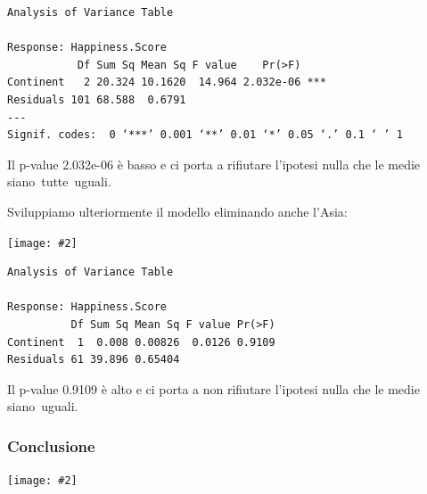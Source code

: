 \documentclass{beamer}
\newcommand{\fg}[2]{%
  \begin{center}
      \texttt{[image: \#2]}%
  \end{center}
}
\begin{document}
\begin{frame}[fragile]
    \tiny
    \begin{verbatim}
Analysis of Variance Table

Response: Happiness.Score
           Df Sum Sq Mean Sq F value    Pr(>F)    
Continent   2 20.324 10.1620  14.964 2.032e-06 ***
Residuals 101 68.588  0.6791                      
---
Signif. codes:  0 ‘***’ 0.001 ‘**’ 0.01 ‘*’ 0.05 ‘.’ 0.1 ‘ ’ 1
    \end{verbatim}

    \normalsize Il p-value 2.032e-06 è basso e ci porta a rifiutare l'ipotesi nulla che le medie siano tutte uguali.
\end{frame}

\begin{frame}
    Sviluppiamo ulteriormente il modello eliminando anche l'Asia:

    \fg{0.6}{box4}
\end{frame}

\begin{frame}[fragile]
    \tiny
    \begin{verbatim}
Analysis of Variance Table

Response: Happiness.Score
          Df Sum Sq Mean Sq F value Pr(>F)
Continent  1  0.008 0.00826  0.0126 0.9109
Residuals 61 39.896 0.65404  
    \end{verbatim}

    \normalsize Il p-value 0.9109 è alto e ci porta a non rifiutare l'ipotesi nulla che le medie siano uguali.
\end{frame}

\begin{frame}
    \frametitle{Conclusione}

    \fg{0.8}{box_ultimaslide}

\end{frame}
\end{document}
